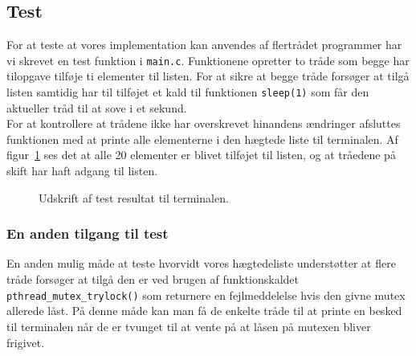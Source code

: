\documentclass[main.tex]{subfile}
\begin{document}
\subsection{Test}\label{sec:del2_test}
For at teste at vores implementation kan anvendes af flertrådet programmer har vi skrevet en test funktion i \texttt{main.c}. Funktionene opretter to tråde som begge har tilopgave tilføje ti elementer til listen. For at sikre at begge tråde forsøger at tilgå listen samtidig har til tilføjet et kald til funktionen \texttt{sleep(1)} som får den aktueller tråd til at sove i et sekund.\\

For at kontrollere at trådene ikke har overskrevet hinandens ændringer afsluttes funktionen med at printe alle elementerne i den hægtede liste til terminalen. Af figur~\ref{fig:opg2_2_test} ses det at alle 20 elementer er blivet tilføjet til listen, og at tråedene på skift har haft adgang til listen. 

\begin{figure}[H]
\center
{}
\caption{Udskrift af test resultat til terminalen.}
\label{fig:opg2_2_test}
\end{figure}

\subsubsection{En anden tilgang til test}
En anden mulig måde at teste hvorvidt vores hægtedeliste understøtter at flere tråde forsøger at tilgå den er ved brugen af funktionskaldet \texttt{pthread\_mutex\_trylock()} som returnere en fejlmeddelelse hvis den givne mutex allerede låst. På denne måde kan man få de enkelte tråde til at printe en besked til terminalen når de er tvunget til at vente på at låsen på mutexen bliver frigivet. 
\end{document}
